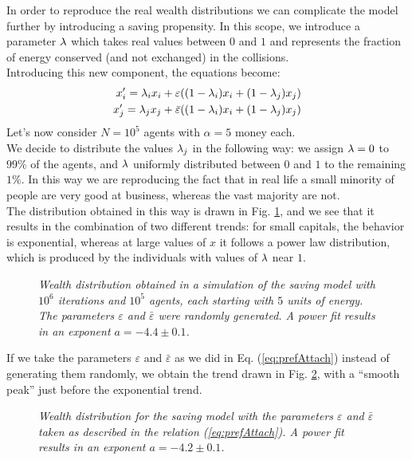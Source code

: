 In order to reproduce the real wealth distributions we can complicate the model further by introducing a saving propensity.
In this scope, we introduce a parameter $\lambda$ which takes real values between $0$ and $1$ and represents the fraction of energy conserved (and not exchanged) in the collisions. \\
Introducing this new component, the equations become:
\begin{equation}
	\begin{split}
		x'_i = \lambda_ix_i + \varepsilon((1-\lambda_i)x_i + (1-\lambda_j)x_j) 	\\
		x'_j = \lambda_jx_j + \bar{\varepsilon}((1-\lambda_i)x_i + (1-\lambda_j)x_j) 	\\
	\end{split}
\end{equation}
Let's now consider $N = 10^5$ agents with $\alpha = 5$ money each. \\
We decide to distribute the values $\lambda_j$ in the following way: we assign $\lambda = 0$ to $99 \%$ of the agents, and $\lambda$ uniformly distributed between $0$ and $1$ to the remaining $1 \%$. In this way we are reproducing the fact that in real life a small minority of people are very good at business, whereas the vast majority are not. \\
The distribution obtained in this way is drawn in Fig. \ref{fig:savings}, and we see that it results in the combination of two different trends: for small capitals, the behavior is exponential, whereas at large values of $x$ it follows a power law distribution, which is produced by the individuals with values of $\lambda$ near $1$.
\begin{figure}[H]
    \centering
    \scalebox{.7}{}
    \caption{\emph{Wealth distribution obtained in a simulation of the saving model with $10^6$ iterations and $10^5$ agents, each starting with $5$ units of energy.
					The parameters $\varepsilon$ and $\bar{\varepsilon}$ were randomly generated.
					A power fit results in an exponent $a = -4.4 \pm 0.1$.}}
    \label{fig:savings}
\end{figure}
If we take the parameters $\varepsilon$ and $\bar{\varepsilon}$ as we did in Eq. (\ref{eq:prefAttach}) instead of generating them randomly, we obtain the trend drawn in Fig. \ref{fig:savingsPref}, with a ``smooth peak'' just before the exponential trend.
\begin{figure}[H]
    \centering
    \scalebox{.7}{}
    \caption{\emph{Wealth distribution for the saving model with the parameters $\varepsilon$ and $\bar{\varepsilon}$ taken as described in the relation (\ref{eq:prefAttach}).
					A power fit results in an exponent $a = -4.2 \pm 0.1$.}}
    \label{fig:savingsPref}
\end{figure}
